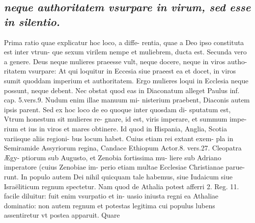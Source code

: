 \documentclass{article}
\begin{document}
\begin{pages}
\subsection*{\textit{neque authoritatem vsurpare in virum, sed esse in silentio. }}\pstart Prima ratio quae explicatur hoc loco, a diffe- rentia, quae a Deo ipso constituta est inter vtrun- que sexum virilem nempe et muliebrem, ducta est. Secunda vero a genere. Deus neque mulieres praeesse vult, neque docere, neque  in viros autho- ritatem vsurpare: At qui loquitur in Eccesia siue praeest ea et docet, in viros sumit quoddam imperium et authoritatem. Ergo mulieres loqui in Ecclesia neque possunt, neque debent. Nec obstat quod eas in Diaconatum alleget Paulus inf. cap. 5.vers.9. Nudum enim illae manuum mi- nisterium praebent, Diaconis autem ipsis parent. Sed ex hoc loco de eo quoque inter quosdam di- sputatum est, Vtrum honestum sit mulieres re- gnare, id est, viris imperare, et summum impe- rium et ius in viros et mares obtinere. Id quod in Hispania, Anglia, Scotia variisque aliis regioni- bus locum habet. Cuius etiam rei extant exem- pla in Semiramide Assyriorum regina, Candace Ethiopum Actor.8. vers.27. Cleopatra Ægy- ptiorum sub Augusto, et Zenobia fortissima mu- liere sub Adriano imperatore (cuius Zenobiae im- perio etiam multae Ecclesiae Christianae parue- runt. In populo autem Dei nihil quicquam tale habemus, siue Iudaicum siue Israëliticum regnum spectetur. Nam quod de Athalia potest afferri 2. Reg. 11. facile diluitur: fuit enim vsurpatio et in- uasio iniusta regni ea Athaliae dominatio: non autem regnum et potestas legitima cui populus lubens assentiretur vt postea apparuit. Quare  \pend

\end{pages}
\end{document}
